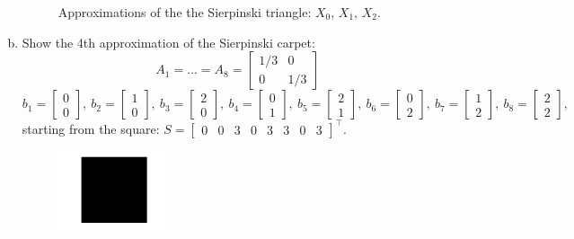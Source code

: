 \documentclass[a4paper, fleqn, 10pt]{report}
\theoremstyle{definition}
\begin{document}
\begin{enumerate}[a)]
\begin{figure}[ht!]
  \caption{Approximations of the the Sierpinski triangle: $X_0,\,X_1,\,X_2$.}\label{fig:ifs}
\end{figure}
\item Show the 4th approximation of the Sierpinski carpet:
 \[A_1 =  \dots = A_8 = \begin{bmatrix}
          1/3 & 0\\
          0   & 1/3
         \end{bmatrix}\]
\[       b_1 = \begin{bmatrix}
          0 \\
          0  
         \end{bmatrix},\
         b_2 = \begin{bmatrix}
          1 \\
          0  
         \end{bmatrix},\
         b_3 = \begin{bmatrix}
          2 \\
          0
         \end{bmatrix},\
         b_4 = \begin{bmatrix}
          0 \\
          1
         \end{bmatrix},\
         b_5 = \begin{bmatrix}
          2 \\
          1
         \end{bmatrix},\
         b_6 = \begin{bmatrix}
          0 \\
          2
         \end{bmatrix},\
         b_7 = \begin{bmatrix}
          1 \\
          2
         \end{bmatrix},\
         b_8 = \begin{bmatrix}
          2 \\
          2
         \end{bmatrix},
\]
starting from the square: $S=\begin{bmatrix}0 & 0 & 3 & 0 & 3 & 3 & 0 & 3\end{bmatrix}^\top.$
\begin{figure}[ht!]
\centering
  \includegraphics[width=0.3\textwidth]{carpet1}

\end{figure}
\end{enumerate}
\end{document}
